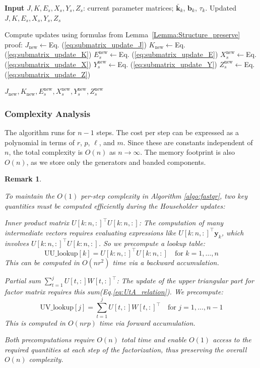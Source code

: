 \documentclass[a4paper,fleqn]{cas-sc}
\def\bfy{{\mathbf y}}
\newtheorem{remark}{Remark}[section]
\begin{document}
\begin{algorithm}
\caption{UpdateMatrices}
\label{algo:update_hmbpsm}
\begin{algorithmic}
\State \textbf{Input} $J, K, E_s, X_s, Y_s, Z_s$: current parameter matrices;
$\bar{\mathbf{k}}_{k}$, $\mathbf{b}_{k}$, $\tau_k$.
\Ensure Updated $J, K, E_s, X_s, Y_s, Z_s$

\State Compute updates using formulas from Lemma~\ref{Lemma:Structure_preserve} proof:
\State $J_{\text{new}} \gets $Eq. (\ref{eq:submatrix_update_J})
\State $K_{\text{new}} \gets $Eq. (\ref{eq:submatrix_update_K})
\State $E_s^{\text{new}} \gets $Eq. (\ref{eq:submatrix_update_E})
\State $X_s^{\text{new}} \gets $Eq. (\ref{eq:submatrix_update_X})
\State $Y_s^{\text{new}} \gets $Eq. (\ref{eq:submatrix_update_Y})
\State $Z_s^{\text{new}} \gets $Eq. (\ref{eq:submatrix_update_Z})

\State \Return $J_{\text{new}}, K_{\text{new}}, E_s^{\text{new}}, X_s^{\text{new}}, Y_s^{\text{new}}, Z_s^{\text{new}}$
\end{algorithmic}
\end{algorithm}

\subsubsection*{Complexity Analysis}

The algorithm runs for $n-1$ steps. The cost per step can be expressed as a polynomial in terms of $r$, $p$, $\ell$, and $m$. Since these are constants independent of $n$, the total complexity is $O(n)$ as $n \rightarrow \infty$. The memory footprint is also $O(n)$, as we store only the generators and banded components.

\begin{remark}\label{Remark:lookup}

To maintain the $O(1)$ per-step complexity in Algorithm \ref{algo:fastqr}, two key quantities must be computed efficiently during the Householder updates:


    Inner product matrix $U[k:n,:]^\top U[k:n,:]$: The computation of many intermediate vectors requires evaluating expressions like $U[k:n,:]^\top \bfy_k $, which involves $U[k:n,:]^\top U[k:n,:]$. So we precompute a lookup table:
    \[
    \text{UU\_lookup}[k] = U[k:n,:]^\top U[k:n,:] \quad \text{for } k = 1,\dots,n
    \]
    This can be computed in $O(nr^2)$ time via a backward accumulation.

    Partial sum $\sum_{t=1}^{j} U[t,:] W[t,:]^\top$: The update of the upper triangular part for factor matrix requires this sum(Eq.\ref{eq:UtA_relation}). We precompute:
    \[
    \text{UV\_lookup}[j] = \sum_{t=1}^{j} U[t,:] W[t,:]^\top \quad \text{for } j = 1,\dots,n-1
    \]
    This is computed in $O(nrp)$ time via forward accumulation.

Both precomputations require $O(n)$ total time and enable $O(1)$ access to the required quantities at each step of the factorization, thus preserving the overall $O(n)$ complexity.
\end{remark}
\end{document}
